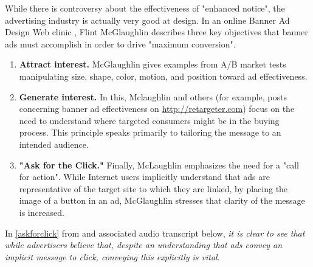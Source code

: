\begin{sloppier}
While there is controversy about the effectiveness of "enhanced notice", the advertising industry is actually very good at design. In an online Banner Ad Design Web clinic \citep{BannerAdDesign:2011tg}, Flint McGlaughlin describes three key objectives that banner ads must accomplish in order to drive "maximum conversion".
\end{sloppier}
\begin{enumerate}
\item \textbf{Attract interest.} McGlaughlin gives examples from A/B market tests manipulating size, shape, color, motion, and position toward ad effectiveness.
\item \textbf{Generate interest.} In this, Mclaughlin and others (for example, posts concerning banner ad effectiveness on \url{http://retargeter.com}) focus on the need to understand where targeted consumers might be in the buying process. This principle speaks primarily to tailoring the message to an intended audience.
\item \textbf{"Ask for the Click."} Finally, McLaughlin emphasizes the need for a "call for action". While Internet users implicitly understand that ads are representative of the target site to which they are linked, by placing the image of a button in an ad, McGlaughlin stresses that clarity of the message is increased.
\end{enumerate}


In  \autoref{askforclick} from \cite{BannerAdDesign:2011tg}  and associated audio transcript below, \emph{it is clear to see that while advertisers believe that, despite an understanding that ads convey an implicit message to click, conveying this explicitly is vital}.



